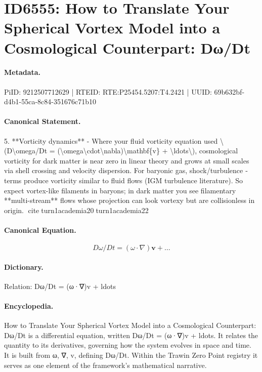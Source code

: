 \section*{ID6555: How to Translate Your Spherical Vortex Model into a Cosmological Counterpart: Dω/Dt}
\paragraph{Metadata.}
PiID: 9212507712629 | RTEID: RTE:P25454.5207:T4.2421 | UUID: 69b632bf-d4b1-55ca-8c84-351676c71b10

\paragraph{Canonical Statement.}
5. **Vorticity dynamics** - Where your fluid vorticity equation used \textbackslash{}(D\textbackslash{}omega/Dt = (\textbackslash{}omega\textbackslash{}cdot\textbackslash{}nabla)\textbackslash{}mathbf\{v\} + \textbackslash{}ldots\textbackslash{}), cosmological vorticity for dark matter is near zero in linear theory and grows at small scales via shell crossing and velocity dispersion. For baryonic gas, shock/turbulence ­terms produce vorticity similar to fluid flows (IGM turbulence literature). So expect vortex-like filaments in baryons; in dark matter you see filamentary **multi-stream** flows whose projection can look vortexy but are collisionless in origin. citeturn1academia20turn1academia22

\paragraph{Canonical Equation.}
\[
D\omega/Dt = (\omega\cdot\nabla)\mathbf{v} + \ldots
\]

\paragraph{Dictionary.}
Relation: Dω/Dt = (ω·∇)v + ldots

\paragraph{Encyclopedia.}
How to Translate Your Spherical Vortex Model into a Cosmological Counterpart: Dω/Dt is a differential equation, written Dω/Dt = (ω·∇)v + ldots. It relates the quantity to its derivatives, governing how the system evolves in space and time. It is built from ω, ∇, v, defining Dω/Dt. Within the Trawin Zero Point registry it serves as one element of the framework's mathematical narrative.
